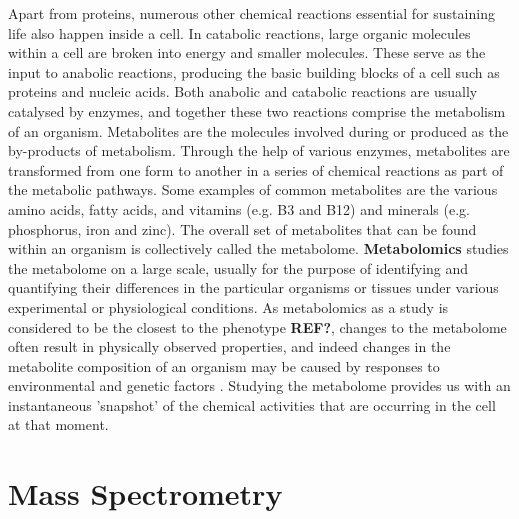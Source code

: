 Apart from proteins, numerous other chemical reactions essential for sustaining life also happen inside a cell. In catabolic reactions, large organic molecules  within a cell are broken into energy and smaller molecules. These serve as the input to anabolic reactions, producing the basic building blocks of a cell such as proteins and nucleic acids. Both anabolic and catabolic reactions are usually catalysed by enzymes, and together these two reactions comprise the metabolism of an organism. Metabolites are the molecules involved during or produced as the by-products of metabolism. Through the help of various enzymes, metabolites are transformed from one form to another in a series of chemical reactions as part of the metabolic pathways. Some examples of common metabolites are the various amino acids, fatty acids, and vitamins (e.g. B3 and B12) and minerals (e.g. phosphorus, iron and zinc). The overall set of metabolites that can be found within an organism is collectively called the metabolome. \textbf{Metabolomics} studies the metabolome on a large scale, usually for the purpose of identifying and quantifying their differences in the particular organisms or tissues under various experimental or physiological conditions. As metabolomics as a study is considered to be the closest to the phenotype \textbf{REF?}, changes to the metabolome often result in physically observed properties, and indeed changes in the metabolite composition of an organism may be caused by responses to environmental and genetic factors \cite{Katajamaa2007}. Studying the metabolome provides us with an instantaneous 'snapshot' of the chemical activities that are occurring in the cell at that moment. 

\section{Mass Spectrometry\label{sub:mass-spec}}

